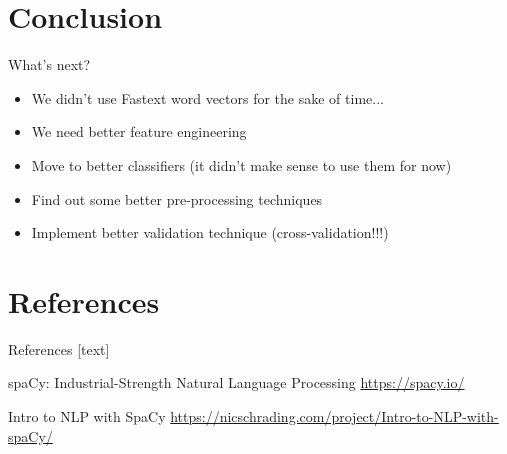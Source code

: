 \documentclass[xcolor=dvipsnames]{beamer}
\begin{document}
\section{Conclusion}

\begin{frame}{What's next?}
\begin{itemize}
\item We didn't use Fastext word vectors for the sake of time...
\item We need better feature engineering
\item Move to better classifiers (it didn't make sense to use them for now)
\item Find out some better pre-processing techniques
\item Implement better validation technique (cross-validation!!!)
\end{itemize}
\end{frame}


\section{References}
\begin{frame}[allowframebreaks]{References}
[text]
 \begin{thebibliography}{99} %
 spaCy: Industrial-Strength Natural Language Processing
\footnotesize \url{https://spacy.io/}

 Intro to NLP with SpaCy
\footnotesize\url{https://nicschrading.com/project/Intro-to-NLP-with-spaCy/}

\end{thebibliography}

\end{frame}

\end{document}
